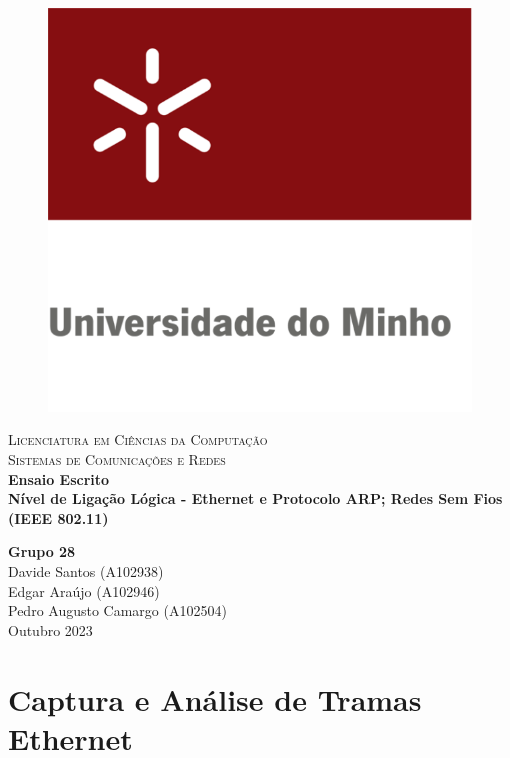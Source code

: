 \documentclass{article}
\begin{document}
\begin{titlepage}

\center %

\newcommand{\HRule}{\rule{\linewidth}{0.4mm}} %

\begin{figure}[h]
    \centering
    \includegraphics[width=0.24\linewidth]{images/uniMinho.jpg}
\end{figure}

\textsc{\Large Licenciatura em Ciências da Computação}\\[0.4cm] %
\textsc{\Large Sistemas de Comunicações e Redes}\\[5cm]

{\Large\bfseries Ensaio Escrito}\\[0.5cm]
{\LARGE \bfseries   Nível de Ligação Lógica - Ethernet e Protocolo ARP; Redes Sem Fios (IEEE 802.11)} %


\vspace{5cm} %
{\bfseries Grupo 28} \\ \vspace{3mm}
Davide Santos (A102938) \\ \vspace{3mm}
Edgar Araújo (A102946) \\ \vspace{3mm}
Pedro Augusto Camargo (A102504) \\ \vspace{3mm}
\vspace{0.2cm}
{Outubro 2023}\\[0.2cm] %

\vfill %
\end{titlepage}

\tableofcontents
\pagebreak

\section{Captura e Análise de Tramas Ethernet}
\end{document}
